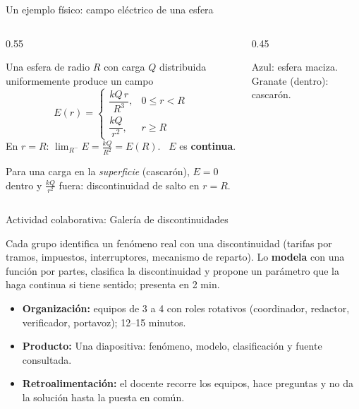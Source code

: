 \documentclass[10pt,aspectratio=169]{beamer}
\begin{document}
\begin{frame}{Un ejemplo físico: campo eléctrico de una esfera}
  \begin{columns}
    \begin{column}{0.55\textwidth}
      \begin{ejemplo}[8]
        Una esfera de radio $R$ con carga $Q$ distribuida uniformemente produce un campo
        \[ E(r)=\begin{cases}\dfrac{kQ\,r}{R^3},&0\le r<R\\[2mm] \dfrac{kQ}{r^2},&r\ge R\end{cases} \]
        En $r=R$: $\lim_{R^-}E=\frac{kQ}{R^2}=E(R)$. \ $E$ es \textbf{continua}.
      \end{ejemplo}
      \begin{observacion}
        Para una carga en la \emph{superficie} (cascarón), $E=0$ dentro y $\frac{kQ}{r^2}$ fuera: discontinuidad de salto en $r=R$.
      \end{observacion}
    \end{column}
    \begin{column}{0.45\textwidth}
      \centering

      \small Azul: esfera maciza. Granate (dentro): cascarón.
    \end{column}
  \end{columns}
\end{frame}

\begin{frame}{Actividad colaborativa: Galería de discontinuidades}
  \small
  \begin{activa}
    Cada grupo identifica un fenómeno real con una discontinuidad (tarifas por tramos, impuestos, interruptores, mecanismo de reparto). Lo \textbf{modela} con una función por partes, clasifica la discontinuidad y propone un parámetro que la haga continua si tiene sentido; presenta en 2 min.
  \end{activa}
  \begin{itemize}
    \item \textbf{Organización:} equipos de 3 a 4 con roles rotativos (coordinador, redactor, verificador, portavoz); 12--15 minutos.
    \item \textbf{Producto:} Una diapositiva: fenómeno, modelo, clasificación y fuente consultada.
    \item \textbf{Retroalimentación:} el docente recorre los equipos, hace preguntas y no da la solución hasta la puesta en común.
  \end{itemize}
\end{frame}
\end{document}
